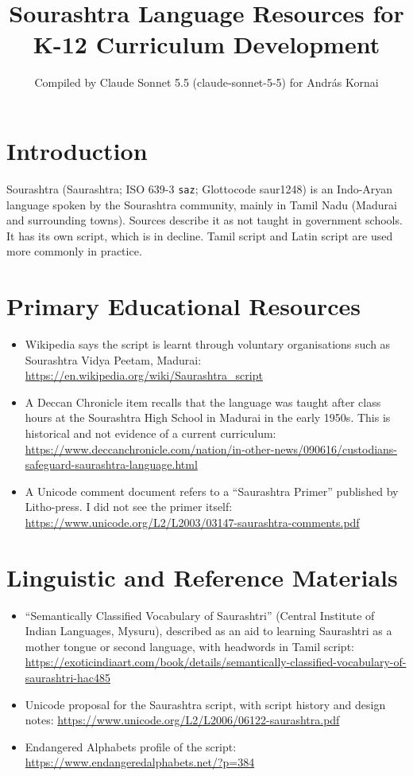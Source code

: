 \documentclass[12pt]{article}
\title{Sourashtra Language Resources for K-12 Curriculum Development}
\author{Compiled by Claude Sonnet 5.5 (claude-sonnet-5-5) for Andr\'as Kornai}
\date{}
\begin{document}
\maketitle

\section{Introduction}
Sourashtra (Saurashtra; ISO 639-3 \texttt{saz}; Glottocode saur1248) is an Indo-Aryan language spoken by the Sourashtra community, mainly in Tamil Nadu (Madurai and surrounding towns). Sources describe it as not taught in government schools. It has its own script, which is in decline. Tamil script and Latin script are used more commonly in practice.

\section{Primary Educational Resources}
\begin{itemize}
\item Wikipedia says the script is learnt through voluntary organisations such as Sourashtra Vidya Peetam, Madurai: \url{https://en.wikipedia.org/wiki/Saurashtra_script}
\item A Deccan Chronicle item recalls that the language was taught after class hours at the Sourashtra High School in Madurai in the early 1950s. This is historical and not evidence of a current curriculum: \url{https://www.deccanchronicle.com/nation/in-other-news/090616/custodians-safeguard-saurashtra-language.html}
\item A Unicode comment document refers to a ``Saurashtra Primer'' published by Litho-press. I did not see the primer itself: \url{https://www.unicode.org/L2/L2003/03147-saurashtra-comments.pdf}
\end{itemize}

\section{Linguistic and Reference Materials}
\begin{itemize}
\item ``Semantically Classified Vocabulary of Saurashtri'' (Central Institute of Indian Languages, Mysuru), described as an aid to learning Saurashtri as a mother tongue or second language, with headwords in Tamil script: \url{https://exoticindiaart.com/book/details/semantically-classified-vocabulary-of-saurashtri-hac485}
\item Unicode proposal for the Saurashtra script, with script history and design notes: \url{https://www.unicode.org/L2/L2006/06122-saurashtra.pdf}
\item Endangered Alphabets profile of the script: \url{https://www.endangeredalphabets.net/?p=384}
\end{itemize}
\end{document}
